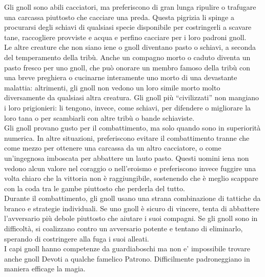 \begin{multicols}{2}
Gli gnoll sono abili cacciatori, ma preferiscono di gran lunga ripulire o trafugare una carcassa piuttosto che cacciare una preda. Questa pigrizia li spinge a procurarsi degli schiavi di qualsiasi specie disponibile per costringerli a scavare tane, raccogliere provviste e acqua e perfino cacciare per i loro padroni gnoll.\\

Le altre creature che non siano iene o gnoll diventano pasto o schiavi, a seconda del temperamento della tribù. Anche un compagno morto o caduto diventa un pasto fresco per uno gnoll, che può onorare un membro famoso della tribù con una breve preghiera o cucinarne interamente uno morto di una devastante malattia: altrimenti, gli gnoll non vedono un loro simile morto molto diversamente da qualsiasi altra creatura. Gli gnoll più “civilizzati” non mangiano i loro prigionieri: li tengono, invece, come schiavi, per difendere o migliorare la loro tana o per scambiarli con altre tribù o bande schiaviste.\\

Gli gnoll provano gusto per il combattimento, ma solo quando sono in superiorità numerica. In altre situazioni, preferiscono evitare il combattimento tranne che come mezzo per ottenere una carcassa da un altro cacciatore, o come un’ingegnosa imboscata per abbattere un lauto pasto. Questi uomini iena non vedono alcun valore nel coraggio o nell'eroismo e preferiscono invece fuggire una volta chiaro che la vittoria non è raggiungibile, sostenendo che è meglio scappare con la coda tra le gambe piuttosto che perderla del tutto.\\

Durante il combattimento, gli gnoll usano una strana combinazione di tattiche da branco e strategie individuali. Se uno gnoll è sicuro di vincere, tenta di abbattere l’avversario più debole piuttosto che aiutare i suoi compagni. Se gli gnoll sono in difficoltà, si coalizzano contro un avversario potente e tentano di eliminarlo, sperando di costringere alla fuga i suoi alleati.\\

I capi gnoll hanno competenze da guardiaboschi ma non e' impossibile trovare anche gnoll Devoti a qualche famelico Patrono. Difficilmente padroneggiano in maniera efficage la magia.\\



\end{multicols}
